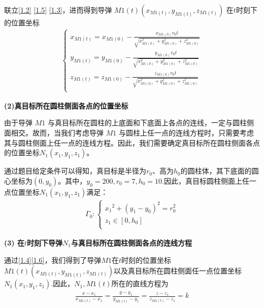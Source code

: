 \documentclass[../main.tex]{subfiles}
\begin{document}
\par 联立\eqref{1.2} \eqref{1.5} \eqref{1.3}，进而得到导弹 \( M1(t)(x_{M1(t)}, y_{M1(t)}, z_{M1(t)}) \) 在$t$时刻下的位置坐标
\begin{align}\label{1.4}
\left\{ \begin{array}{l}
x_{M1(t)}=x_{M1(0)}-\frac{x_{M1(0)}v_0t}{\sqrt{x_{M1(0)}^{2}+y_{M1(0)}^{2}+z_{M1(0)}^{2}}}\\
y_{M1(t)}=y_{M1(0)}-\frac{y_{M1(0)}v_0t}{\sqrt{x_{M1(0)}^{2}+y_{M1(0)}^{2}+z_{M1(0)}^{2}}}\\
z_{M1(t)}=z_{M1(0)}-\frac{z_{M1(0)}v_0t}{\sqrt{x_{M1(0)}^{2}+y_{M1(0)}^{2}+z_{M1(0)}^{2}}}\\
\end{array} \right. 
\end{align}


\noindent\textbf{(2)真目标所在圆柱侧面各点的位置坐标}
\par 由于导弹 \( M1 \) 与真目标所在圆柱的上底面和下底面上各点的连线，一定与圆柱侧面相交。故而，当我们考虑导弹 \( M1 \) 与圆柱上任一点的连线方程时，只需要考虑其与圆柱侧面上任一点的连线方程。因此，我们需要确定真目标所在圆柱侧面各点的位置坐标$N_1\left( x_1,y_1,z_1 \right) $。
\par 通过题目给定条件可以得知，真目标是半径为$r_0$、高为$h_0$的圆柱体，其下底面的圆心坐标为$\left( 0,y_0 \right)$。其中，$y_0=200,r_0=7,h_0=10$.因此，真目标圆柱侧面上任一点位置坐标$N_1\left( x_1,y_1,z_1 \right) $满足：
\begin{align}\label{1.6}
\varGamma _0:\begin{cases}
{x_1}^2+\left( y_1-y_0 \right) ^2=r_{0}^{2}\\
z_1\in \left[ 0,h_0 \right]\\
\end{cases}
\end{align}





\noindent\textbf{(3) 在\( t \)时刻下导弹\( N_1 \)与真目标所在圆柱侧面各点的连线方程}
\par 通过\eqref{1.4}\eqref{1.6}，我们得到了导弹$M1$在\( t \)时刻的位置坐标\( M1(t)(x_{M1(t)}, y_{M1(t)}, z_{M1(t)}) \)以及真目标所在圆柱侧面任一点位置坐标$N_1\left( x_1,y_1,z_1 \right) $.因此，$N_1,M1(t)$所在的直线方程为
\begin{align}\label{1.7}
\frac{x-x_1}{x_{M1(t)}-x_1}=\frac{y-y_1}{y_{M1(t)}-y_1}=\frac{z-z_1}{z_{M1(t)}-z_1}=k 
\end{align}
\end{document}
